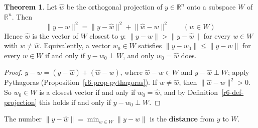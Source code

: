 \documentclass[12pt]{article}
\newcommand{\R}{\mathbb R}
\theoremstyle{definition}
\newtheorem{theorem}{Theorem}
\begin{document}
\begin{theorem}\label{r6-thm-best-approximation}
Let \(\hat w\) be the orthogonal projection of \(y\in\R^n\) onto a subspace \(W\) of \(\R^n\). Then
\[
\lVert y-w\rVert^2=\lVert y-\hat w\rVert^2+\lVert \hat w-w\rVert^2\qquad(w\in W)
\]
Hence \(\hat w\) is the vector of \(W\) closest to \(y\): \(\lVert y-w\rVert>\lVert y-\hat w\rVert\) for every \(w\in W\)
with \(w\ne\hat w\). Equivalently, a vector \(w_0\in W\) satisfies \(\lVert y-w_0\rVert\leqslant\lVert y-w\rVert\) for
every \(w\in W\) if and only if \(y-w_0\perp W\), and only \(w_0=\hat w\) does.
\end{theorem}
\begin{proof}
\(y-w=(y-\hat w)+(\hat w-w)\), where \(\hat w-w\in W\) and \(y-\hat w\perp W\); apply Pythagoras
(Proposition~\ref{r6-prop-pythagoras}). If \(w\ne\hat w\), then \(\lVert \hat w-w\rVert^2>0\). So \(w_0\in W\) is a
closest vector if and only if \(w_0=\hat w\), and by Definition~\ref{r6-def-projection} this holds if and only if
\(y-w_0\perp W\).
\end{proof}
The number \(\lVert y-\hat w\rVert=\min_{w\in W}\lVert y-w\rVert\) is the \textbf{distance} from \(y\) to \(W\).
\end{document}
